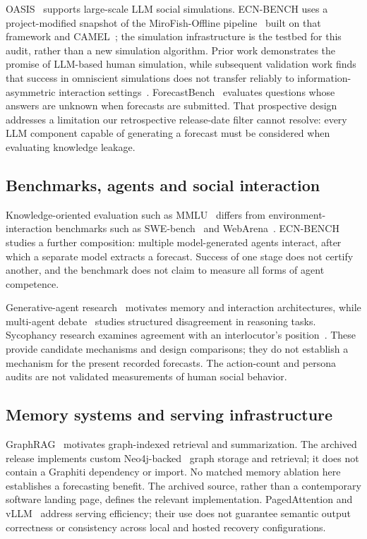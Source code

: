 \documentclass[10pt,conference]{IEEEtran}
\begin{document}
OASIS~\cite{yang2024,oasissoftware} supports large-scale LLM social simulations.
ECN-BENCH uses a project-modified snapshot of the MiroFish-Offline
pipeline~\cite{mirofishoffline,mirofishupstream} built on that framework and
CAMEL~\cite{camelsoftware}; the simulation
infrastructure is the testbed for this audit, rather than a new simulation
algorithm. Prior work demonstrates the promise of LLM-based human simulation,
while subsequent validation work finds that success in omniscient simulations
does not transfer reliably to information-asymmetric interaction
settings~\cite{aher2023simulate,zhou2024socialsimulation}.
ForecastBench~\cite{karger2024} evaluates questions whose answers are unknown when
forecasts are submitted. That prospective design addresses a limitation our
retrospective release-date filter cannot resolve: every LLM component capable
of generating a forecast must be considered when evaluating knowledge leakage.


\subsection{Benchmarks, agents and social interaction}
Knowledge-oriented evaluation such as MMLU~\cite{mmlu} differs from
environment-interaction benchmarks such as SWE-bench~\cite{swebench} and
WebArena~\cite{webarena2023}. ECN-BENCH studies a further composition:
multiple model-generated agents interact, after which a separate model
extracts a forecast. Success of one stage does not certify another, and the
benchmark does not claim to measure all forms of agent competence.

Generative-agent research~\cite{park2023generative} motivates memory and
interaction architectures, while multi-agent debate~\cite{du2023debate}
studies structured disagreement in reasoning tasks. Sycophancy research
examines agreement with an interlocutor's position~\cite{sharma2023sycophancy}.
These provide candidate mechanisms and design comparisons; they do not
establish a mechanism for the present recorded forecasts. The action-count
and persona audits are not validated measurements of human social behavior.

\subsection{Memory systems and serving infrastructure}
GraphRAG~\cite{graphrag2024} motivates graph-indexed retrieval and
summarization. The archived release implements custom Neo4j-backed~\cite{neo4jsoftware} graph
storage and retrieval; it does not contain a Graphiti dependency or import.
No matched memory ablation here establishes a forecasting benefit. The archived
source, rather than a contemporary software landing page, defines the relevant
implementation.
PagedAttention and vLLM~\cite{vllm} address serving efficiency; their use
does not guarantee semantic output correctness or consistency across
local and hosted recovery configurations.
\end{document}
